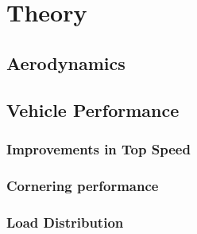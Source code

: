\chapter{Theory}
\section{Aerodynamics}
\section{Vehicle Performance}
\subsection{Improvements in Top Speed}
\subsection{Cornering performance}
\subsection{Load Distribution}
